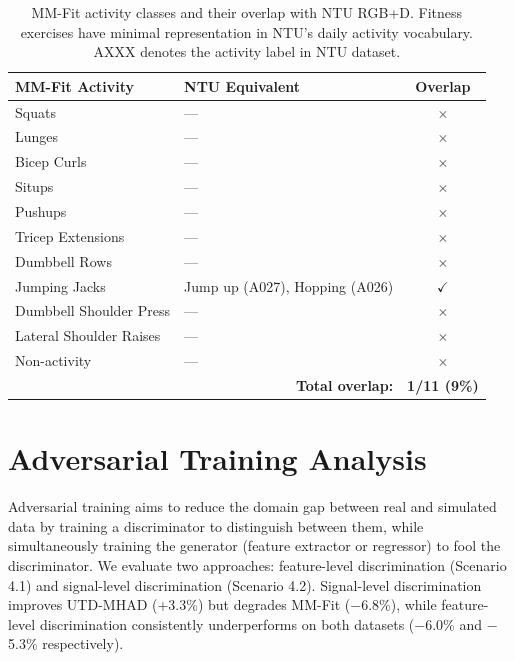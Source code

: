 \begin{table}[!t]
\centering
\caption{MM-Fit activity classes and their overlap with NTU RGB+D. Fitness exercises have minimal representation in NTU's daily activity vocabulary. AXXX denotes the activity label in NTU dataset.}
\label{tab:mmfit-ntu-overlap}
\begin{tabular}{llc}
\toprule
\textbf{MM-Fit Activity} & \textbf{NTU Equivalent} & \textbf{Overlap} \\
\midrule
Squats & --- & $\times$ \\
Lunges & --- & $\times$ \\
Bicep Curls & --- & $\times$ \\
Situps & --- & $\times$ \\
Pushups & --- & $\times$ \\
Tricep Extensions & --- & $\times$ \\
Dumbbell Rows & --- & $\times$ \\
Jumping Jacks & Jump up (A027), Hopping (A026) & $\checkmark$ \\
Dumbbell Shoulder Press & --- & $\times$ \\
Lateral Shoulder Raises & --- & $\times$ \\
Non-activity & --- & $\times$ \\
\midrule
\multicolumn{2}{r}{\textbf{Total overlap:}} & \textbf{1/11 (9\%)} \\
\bottomrule
\end{tabular}
\end{table}

\section{Adversarial Training Analysis}
\label{sec:adversarial-analysis}

Adversarial training aims to reduce the domain gap between real and simulated data by training a discriminator to distinguish between them, while simultaneously training the generator (feature extractor or regressor) to fool the discriminator. We evaluate two approaches: feature-level discrimination (Scenario 4.1) and signal-level discrimination (Scenario 4.2). Signal-level discrimination improves UTD-MHAD (+3.3\%) but degrades MM-Fit ($-$6.8\%), while feature-level discrimination consistently underperforms on both datasets ($-$6.0\% and $-$5.3\% respectively).

